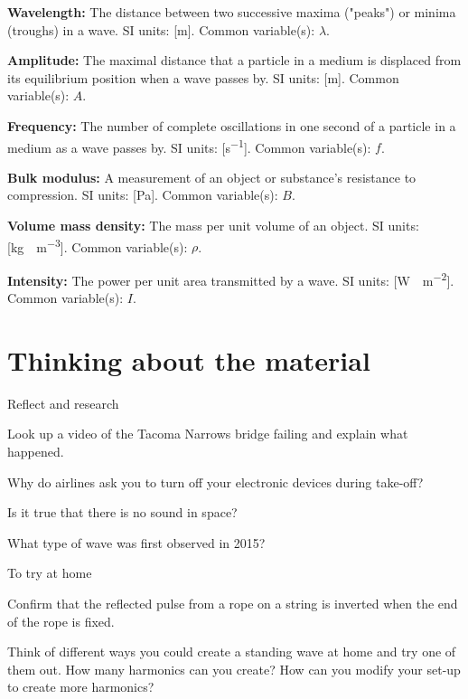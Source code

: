 \begin{definitions}
\item \textbf{Wavelength:} The distance between two successive maxima ("peaks") or minima (troughs) in a wave. SI units: [\si{m}]. Common variable(s): $\lambda$.
\item \textbf{Amplitude:} The maximal distance that a particle in a medium is displaced from its equilibrium position when a wave passes by. SI units: [\si{m}]. Common variable(s): $A$.
\item \textbf{Frequency:} The number of complete oscillations in one second of a particle in a medium as a wave passes by. SI units: [\si{s^{-1}}]. Common variable(s): $f$.
\item \textbf{Bulk modulus:} A measurement of an object or substance's resistance to compression. SI units: [\si{Pa}]. Common variable(s): $B$.
\item \textbf{Volume mass density:} The mass per unit volume of an object. SI units: [\si{kg\cdot m^{-3}}]. Common variable(s): $\rho$.
\item \textbf{Intensity:} The power per unit area transmitted by a wave. SI units: [\si{W\cdot m^{-2}}]. Common variable(s): $I$.
\end{definitions}
\newpage
\section{Thinking about the material}

\begin{chapteractivity}{Reflect and research}
{
\item Look up a video of the Tacoma Narrows bridge failing and explain what happened.
\item Why do airlines ask you to turn off your electronic devices during take-off?
\item Is it true that there is no sound in space?
\item What type of wave was first observed in 2015?
}
\end{chapteractivity}


\begin{chapteractivity}{To try at home}
{
\item Confirm that the reflected pulse from a rope on a string is inverted when the end of the rope is fixed.
\item Think of different ways you could create a standing wave at home and try one of them out. How many harmonics can you create? How can you modify your set-up to create more harmonics?
}
\end{chapteractivity}

